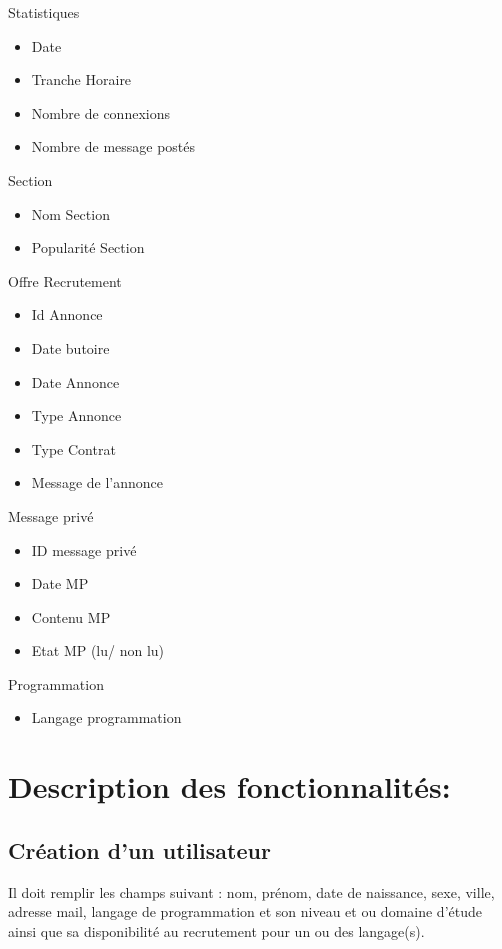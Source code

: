\documentclass{report}
\begin{document}
	Statistiques
  \begin{itemize}
		\item Date
		\item Tranche Horaire
		\item Nombre de connexions
		\item Nombre de message postés\\
    \end{itemize}
	Section
  \begin{itemize}
		\item Nom Section
		\item Popularité Section\\
  \end{itemize}
	Offre Recrutement
	\begin{itemize}
	\item Id Annonce
	\item Date butoire
	\item Date Annonce
	\item Type Annonce
	\item Type Contrat
	\item Message de l'annonce\\
	\end{itemize}
	Message privé
	\begin{itemize}
	\item ID message privé
	\item Date MP
	\item Contenu MP
	\item Etat MP (lu/ non lu)\\
	\end{itemize}
	Programmation
	\begin{itemize}
	\item Langage programmation\\
	\end{itemize}

\section{Description des fonctionnalités:}

\subsection{Création d'un utilisateur}
		Il doit remplir les champs suivant : nom, prénom, date 	de naissance, sexe, ville, adresse mail, langage de programmation et son niveau et ou domaine d’étude ainsi que sa disponibilité au recrutement pour un ou des langage(s).
\end{document}
